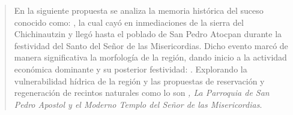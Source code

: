\documentclass[12pt,a4paper]{article}
\begin{document}
\onehalfspacing



\begin{abstract}
En la siguiente propuesta se analiza la memoria histórica del suceso conocido como: 
\textit{}, la cual cayó en inmediaciones de la sierra 
del Chichinautzin y llegó hasta el poblado de San Pedro Atocpan durante la festividad del 
Santo del Señor de las Misericordias. Dicho evento marcó de manera significativa la 
morfología de la región, dando inicio a la actividad económica dominante y su posterior 
festividad: . Explorando la vulnerabilidad hídrica 
de la región y las propuestas de reservación y regeneración de recintos naturales como lo son 
\textit{, 
La Parroquia de San Pedro Apostol y el Moderno Templo del Señor de las Misericordias}.
\end{abstract}

\tableofcontents
\newpage
\listoffigures
\newpage



\clearpage

\clearpage

\clearpage

\clearpage

\clearpage

\clearpage

\clearpage
\newpage


\end{document}

